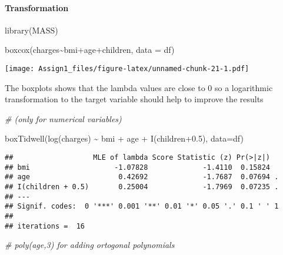 \documentclass[
]{article}
\newenvironment{Shaded}{\begin{snugshade}}{\end{snugshade}}
\newcommand{\AttributeTok}[1]{\textcolor[rgb]{0.77,0.63,0.00}{#1}}
\newcommand{\CommentTok}[1]{\textcolor[rgb]{0.56,0.35,0.01}{\textit{#1}}}
\newcommand{\FloatTok}[1]{\textcolor[rgb]{0.00,0.00,0.81}{#1}}
\newcommand{\FunctionTok}[1]{\textcolor[rgb]{0.00,0.00,0.00}{#1}}
\newcommand{\NormalTok}[1]{#1}
\newcommand{\SpecialCharTok}[1]{\textcolor[rgb]{0.00,0.00,0.00}{#1}}
\begin{document}
\hypertarget{transformation}{%
\paragraph{Transformation}\label{transformation}}

\begin{Shaded}
\begin{Highlighting}[]
\FunctionTok{library}\NormalTok{(MASS)}

\FunctionTok{boxcox}\NormalTok{(charges}\SpecialCharTok{\textasciitilde{}}\NormalTok{bmi}\SpecialCharTok{+}\NormalTok{age}\SpecialCharTok{+}\NormalTok{children, }\AttributeTok{data =}\NormalTok{ df)}
\end{Highlighting}
\end{Shaded}

\texttt{[image: Assign1\_files/figure-latex/unnamed-chunk-21-1.pdf]}

The boxplots shows that the lambda values are close to 0 so a
logarithmic transformation to the target variable should help to improve
the results

\begin{Shaded}
\begin{Highlighting}[]
\CommentTok{\# (only for numerical variables)}

\FunctionTok{boxTidwell}\NormalTok{(}\FunctionTok{log}\NormalTok{(charges) }\SpecialCharTok{\textasciitilde{}}\NormalTok{ bmi }\SpecialCharTok{+}\NormalTok{ age }\SpecialCharTok{+}  \FunctionTok{I}\NormalTok{(children}\FloatTok{+0.5}\NormalTok{), }\AttributeTok{data=}\NormalTok{df)}
\end{Highlighting}
\end{Shaded}

\begin{verbatim}
##                   MLE of lambda Score Statistic (z) Pr(>|z|)  
## bmi                    -1.07828             -1.4110  0.15824  
## age                     0.42692             -1.7687  0.07694 .
## I(children + 0.5)       0.25004             -1.7969  0.07235 .
## ---
## Signif. codes:  0 '***' 0.001 '**' 0.01 '*' 0.05 '.' 0.1 ' ' 1
## 
## iterations =  16
\end{verbatim}

\begin{Shaded}
\begin{Highlighting}[]
\CommentTok{\# poly(age,3) for adding ortogonal polynomials}
\end{Highlighting}
\end{Shaded}
\end{document}
